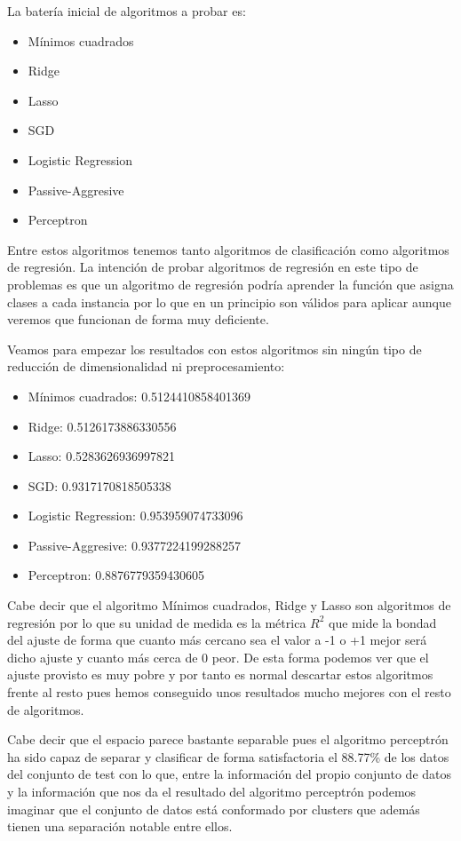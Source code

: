 \documentclass[12pt,a4paper]{article}
\begin{document}
La batería inicial de algoritmos a probar es:

\begin{itemize}
	\item Mínimos cuadrados
	\item Ridge
	\item Lasso
	\item SGD
	\item Logistic Regression
	\item Passive-Aggresive
	\item Perceptron
\end{itemize}

Entre estos algoritmos tenemos tanto algoritmos de clasificación como algoritmos de regresión. La intención de probar algoritmos de regresión en este tipo de problemas es que un algoritmo de regresión podría aprender la función que asigna clases a cada instancia por lo que en un principio son válidos para aplicar aunque veremos que funcionan de forma muy deficiente.

Veamos para empezar los resultados con estos algoritmos sin ningún tipo de reducción de dimensionalidad ni preprocesamiento:

\begin{itemize}
	\item Mínimos cuadrados: 0.5124410858401369
	\item Ridge: 0.5126173886330556
	\item Lasso: 0.5283626936997821
	\item SGD: 0.9317170818505338
	\item Logistic Regression: 0.953959074733096
	\item Passive-Aggresive: 0.9377224199288257
	\item Perceptron: 0.8876779359430605
\end{itemize}

Cabe decir que el algoritmo Mínimos cuadrados, Ridge y Lasso son algoritmos de regresión por lo que su unidad de medida es la métrica $R^2$ que mide la bondad del ajuste de forma que cuanto más cercano sea el valor a -1 o +1 mejor será dicho ajuste y cuanto más cerca de 0 peor. De esta forma podemos ver que el ajuste provisto es muy pobre y por tanto es normal descartar estos algoritmos frente al resto pues hemos conseguido unos resultados mucho mejores con el resto de algoritmos. 

Cabe decir que el espacio parece bastante separable pues el algoritmo perceptrón ha sido capaz de separar y clasificar de forma satisfactoria el 88.77\% de los datos del conjunto de test con lo que, entre la información del propio conjunto de datos y la información que nos da el resultado del algoritmo perceptrón podemos imaginar que el conjunto de datos está conformado por clusters que además tienen una separación notable entre ellos.
\end{document}
